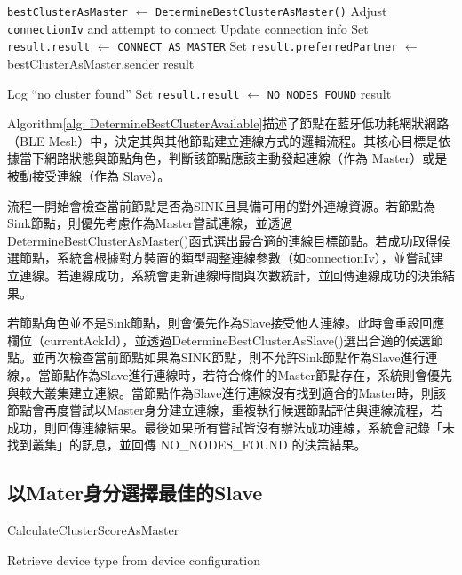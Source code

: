 \begin{ZhChapter}
\begin{algorithm}
\begin{algorithmic}[1]
    \State \texttt{bestClusterAsMaster} $\gets$ \texttt{DetermineBestClusterAsMaster()}
        \State Adjust \texttt{connectionIv} and attempt to connect
            \State Update connection info
        \EndIf
        \State Set \texttt{result.result} $\gets$ \texttt{CONNECT\_AS\_MASTER}
        \State Set \texttt{result.preferredPartner} $\gets$ bestClusterAsMaster.sender
        \State \Return result
    \EndIf

    \State Log ``no cluster found''
    \State Set \texttt{result.result} $\gets$ \texttt{NO\_NODES\_FOUND}
    \State \Return result
\EndIf
\end{algorithmic}
\end{algorithm}

Algorithm\ref{alg: DetermineBestClusterAvailable}描述了節點在藍牙低功耗網狀網路（BLE Mesh）中，決定其與其他節點建立連線方式的邏輯流程。其核心目標是依據當下網路狀態與節點角色，判斷該節點應該主動發起連線（作為 Master）或是被動接受連線（作為 Slave）。

流程一開始會檢查當前節點是否為SINK且具備可用的對外連線資源。若節點為Sink節點，則優先考慮作為Master嘗試連線，並透過DetermineBestClusterAsMaster()函式選出最合適的連線目標節點。若成功取得候選節點，系統會根據對方裝置的類型調整連線參數（如connectionIv），並嘗試建立連線。若連線成功，系統會更新連線時間與次數統計，並回傳連線成功的決策結果。

若節點角色並不是Sink節點，則會優先作為Slave接受他人連線。此時會重設回應欄位（currentAckId），並透過DetermineBestClusterAsSlave()選出合適的候選節點。並再次檢查當前節點如果為SINK節點，則不允許Sink節點作為Slave進行連線，。當節點作為Slave進行連線時，若符合條件的Master節點存在，系統則會優先與較大叢集建立連線。當節點作為Slave進行連線沒有找到適合的Master時，則該節點會再度嘗試以Master身分建立連線，重複執行候選節點評估與連線流程，若成功，則回傳連線結果。最後如果所有嘗試皆沒有辦法成功連線，系統會記錄「未找到叢集」的訊息，並回傳 NO\_NODES\_FOUND 的決策結果。

\subsection{以Mater身分選擇最佳的Slave}

\begin{algorithm}
\caption{CalculateClusterScoreAsMaster}
\label{alg: CalculateClusterScoreAsMaster}
\begin{algorithmic}[1]
\State Retrieve device type from device configuration
  \EndIf
{}  \EndIf
{}  \EndIf
{}  \EndIf
{}  \EndIf
{}  \EndIf
{}  \EndIf
{}  \EndIf
{}  \EndIf


\end{algorithmic}
\end{algorithm}
\end{ZhChapter}
